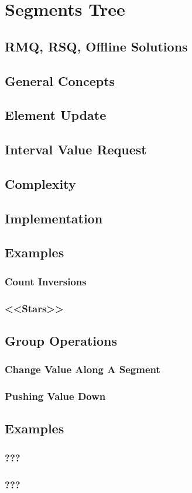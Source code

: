 \documentclass[a4paper,12pt]{article}
\begin{document}
  \section{Segments Tree}

    \subsection{RMQ, RSQ, Offline Solutions}

    \subsection{General Concepts}

    \subsection{Element Update}

    \subsection{Interval Value Request}

    \subsection{Complexity}

    \subsection{Implementation}

    \subsection{Examples}
      \subsubsection{Count Inversions}
      \subsubsection{<<Stars>>}

    \subsection{Group Operations}
      \subsubsection{Change Value Along A Segment}
      \subsubsection{Pushing Value Down}

    \subsection{Examples}
      \subsubsection{???}
      \subsubsection{???}
\end{document}
